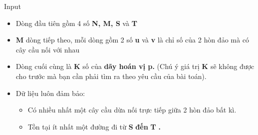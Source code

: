 Input
\begin{itemize}
	\item Dòng đầu tiên gồm 4 số \textbf{ N, M, S } và \textbf{ T }
	\item \textbf{M } dòng tiếp theo, mỗi dòng gồm 2 số \textbf{ u } và \textbf{ v } là chỉ số của 2 hòn đảo mà có cây cầu nối với nhau
	\item Dòng cuối cùng là \textbf{ K } số của \textbf{ dãy hoán vị p. } (Chú ý giá trị \textbf{ K } sẽ không được cho trước mà bạn cần phải tìm ra theo yêu cầu của bài toán).
	\item Dữ liệu luôn đảm bảo:
\begin{itemize}
	\item Có nhiều nhất một cây cầu dừa nối trực tiếp giữa 2 hòn đảo bất kì.
	\item Tồn tại ít nhất một đường đi từ \textbf{ S }\textbf{ đến }\textbf{ T }\textbf{ . }
\end{itemize}
\end{itemize}